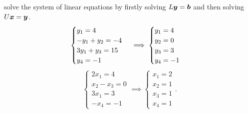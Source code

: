 \documentclass{report}
\begin{document}
{solve the system of linear equations by firstly solving $L\boldsymbol{y} = \boldsymbol{b}$ and then
solving $U\boldsymbol{x} = \boldsymbol{y}$.
\[
    \begin{cases}
        y_1 = 4          \\
        - y_1 + y_2 = -4 \\
        3y_1 + y_3 = 15  \\
        y_4 = -1
    \end{cases}
    \implies
    \begin{cases}
        y_1 = 4 \\
        y_2 = 0 \\
        y_3 = 3 \\
        y_4 = -1
    \end{cases}\\
\]
\[
    \begin{cases}
        2x_1 = 4      \\
        x_2 - x_3 = 0 \\
        3x_1 = 3      \\
        -x_4 = -1
    \end{cases}
    \implies
    \begin{cases}
        x_1 = 2 \\
        x_2 = 1 \\
        x_3 = 1 \\
        x_4 = 1
    \end{cases}.
\]
}
\end{document}
